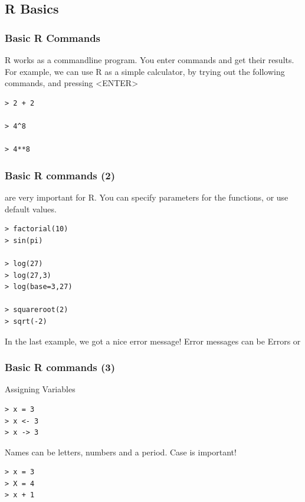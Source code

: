 \documentclass[10pt]{beamer}
\begin{document}
\subsection{R Basics}
\begin{frame}
  \frametitle{Basic R Commands}
  \begin{block}{}
    R works as a commandline program. You enter commands and get their
    results. For example, we can use R as a simple calculator, by
    trying out the following commands, and pressing <ENTER>
  \end{block}
\bigskip

\begin{verbatim}
> 2 + 2

> 4^8

> 4**8
\end{verbatim}
\end{frame}
\begin{frame}
  \frametitle{Basic R commands (2)}
  \begin{block}{}
     are very important for R. You can specify
    parameters for the functions, or use default values.
  \end{block}
\begin{verbatim}
> factorial(10)
> sin(pi)

> log(27)
> log(27,3)
> log(base=3,27)

> squareroot(2)
> sqrt(-2)  
\end{verbatim}
\medskip

In the last example, we got a nice error message! Error messages can
be \alert{Errors} or 
\end{frame}

\begin{frame}
  \frametitle{Basic R commands (3)}
  \begin{block}{Assigning Variables}
\begin{verbatim}
> x = 3
> x <- 3
> x -> 3
\end{verbatim}
\medskip
  \end{block}
  \medskip

  \begin{block}{}
    Names can be letters, numbers and a period.
    \alert{Case is important!}
\begin{verbatim}
> x = 3
> X = 4
> x + 1
\end{verbatim}
  \end{block}
\end{frame}
\end{document}
